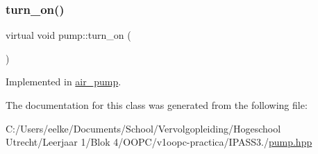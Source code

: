 \mbox{\label{classpump_a2c0ed32be49cad297b49ec2c97403a2c}} 
\subsubsection{\texorpdfstring{turn\+\_\+on()}{turn\_on()}}
{\footnotesize\ttfamily virtual void pump\+::turn\+\_\+on (\begin{DoxyParamCaption}{ }\end{DoxyParamCaption})\hspace{0.3cm}{\ttfamily [pure virtual]}}



Implemented in \hyperlink{classair__pump_a4d97870633167dda02141e0630e468a3}{air\+\_\+pump}.



The documentation for this class was generated from the following file\+:\begin{DoxyCompactItemize}
\item 
C\+:/\+Users/eelke/\+Documents/\+School/\+Vervolgopleiding/\+Hogeschool Utrecht/\+Leerjaar 1/\+Blok 4/\+O\+O\+P\+C/v1oopc-\/practica/\+I\+P\+A\+S\+S3./\hyperlink{pump_8hpp}{pump.\+hpp}\end{DoxyCompactItemize}
